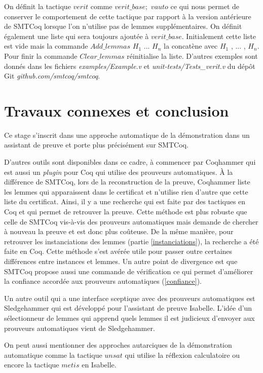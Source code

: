 \documentclass[11pt]{article}
\begin{document}
On définit la tactique $verit$ comme $verit\_base; \,\,vauto$ ce qui nous permet de conserver le comportement de cette tactique par rapport à la version antérieure de SMTCoq lorsque l'on n'utilise pas de lemmes supplémentaires. On définit également une liste qui sera toujours ajoutée à $verit\_base$. Initialement cette liste est vide mais la commande $Add\_lemmas \,\,H_1 \,\,... \,\,H_n$ la concatène avec $H_1$ ,\,\,... ,\,\,$H_n$. Pour finir la commande $Clear\_lemmas$ réinitialise la liste. D'autres exemples sont donnés dans les fichiers \textit{examples/Example.v} et \textit{unit-tests/Tests\_verit.v} du dépôt Git \textit{github.com/smtcoq/smtcoq}.


\section{Travaux connexes et conclusion}

Ce stage s'inscrit dans une approche automatique de la démonstration dans un assistant de preuve et porte plus précisément sur SMTCoq. 

D'autres outils sont disponibles dans ce cadre, à commencer par Coqhammer \cite{coqhammer} qui est aussi un \textit{plugin} pour Coq qui utilise des prouveurs automatiques. À la différence de SMTCoq, lors de la reconstruction de la preuve, Coqhammer liste les lemmes qui apparaissent dans le certificat et n'utilise rien d'autre que cette liste du certificat. Ainsi, il y a une recherche qui est faite par des tactiques en Coq et qui permet de retrouver la preuve. Cette méthode est plus robuste que celle  de SMTCoq vis-à-vis des prouveurs automatiques mais demande de chercher à nouveau la preuve et est donc plus coûteuse. De la même manière, pour retrouver les instanciations des lemmes (partie \ref{instanciations}), la recherche a été faite en Coq. Cette méthode s'est avérée utile pour passer outre certaines différences entre instances et lemmes. Un autre point de divergence est que SMTCoq propose aussi une commande de vérification ce qui permet d'améliorer la confiance accordée aux prouveurs automatiques (\ref{confiance}).


Un autre outil qui a une interface sceptique avec des prouveurs automatiques est Sledgehammer \cite{sledgehammer_manual} qui est  développé pour l'assistant de preuve Isabelle. L'idée d'un sélectionneur de lemmes qui apprend quels lemmes il est judicieux d'envoyer aux prouveurs automatiques \cite{hol_selector} vient de Sledgehammer.

On peut aussi mentionner des approches autarciques de la démonstration automatique comme la tactique $unsat$ \cite{smt_autarcique} qui utilise la réflexion calculatoire ou encore la tactique $metis$ en Isabelle. \medbreak
\end{document}
